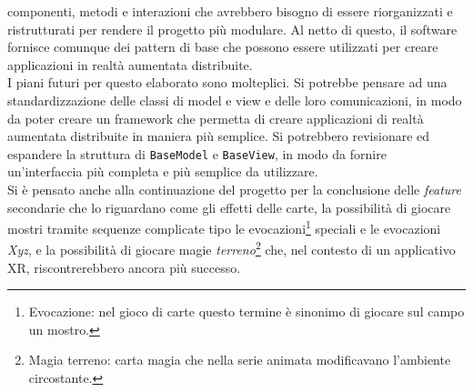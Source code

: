 componenti, metodi e interazioni che avrebbero bisogno di essere riorganizzati e ristrutturati per rendere il progetto più modulare. Al netto di questo, il software fornisce comunque
dei pattern di base che possono essere utilizzati per creare applicazioni in realtà aumentata distribuite.\\
\newline
I piani futuri per questo elaborato sono molteplici. Si potrebbe pensare ad una standardizzazione delle classi di model e view e delle loro comunicazioni, in modo da poter creare
un framework che permetta di creare applicazioni di realtà aumentata distribuite in maniera più semplice. Si potrebbero revisionare ed espandere la struttura di \texttt{BaseModel} e
\texttt{BaseView}, in modo da fornire un'interfaccia più completa e più semplice da utilizzare.\\
Si è pensato anche alla continuazione del progetto per la conclusione delle \textit{feature} secondarie che lo riguardano come gli effetti delle carte, la possibilità di giocare
mostri tramite sequenze complicate tipo le evocazioni\footnote{Evocazione: nel gioco di carte questo termine è sinonimo di giocare sul campo un mostro.} speciali e le evocazioni 
\textit{Xyz}, e la possibilità di giocare magie \textit{terreno}\footnote{Magia terreno: carta magia che nella serie animata modificavano l'ambiente circostante.} che, nel contesto di
un applicativo XR, riscontrerebbero ancora più successo.\\